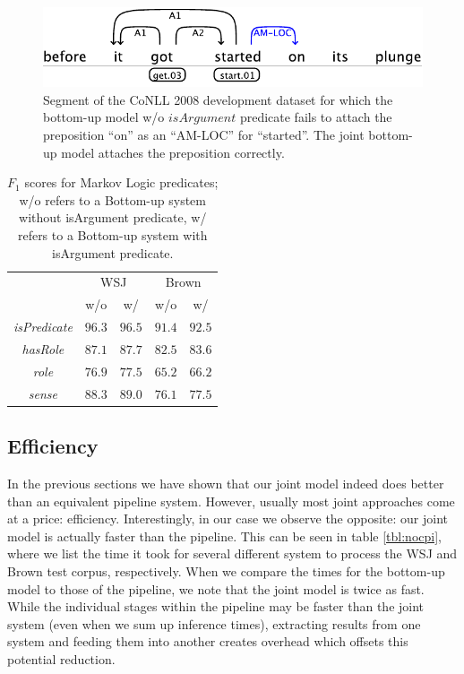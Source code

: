 \begin{figure}
\begin{center}
    \includegraphics[scale=.62]{is-arg-example}
\end{center}
\caption{Segment of the CoNLL 2008 development dataset for which the bottom-up model w/o $isArgument$ predicate fails to attach the preposition ``on'' as an ``AM-LOC'' for ``started''. The joint bottom-up model attaches the preposition correctly.}
\label{fig:isArg}
\end{figure}


\begin{table}[ht]

    \centering
    \begin{tabular}{|c|c|c|c|c|}\hline
      & \multicolumn{2}{c|}{WSJ} & \multicolumn{2}{c|}{Brown}\\
                                  & w/o     & w/     & w/o    & w/  \\\hline 
        \emph{isPredicate}        & $96.3$  & $96.5$ & $91.4$ & $92.5$\\
        \emph{hasRole}            & $87.1$  & $87.7$ & $82.5$ & $83.6$ \\
        \emph{role}               & $76.9$  & $77.5$ & $65.2$ & $66.2$ \\
        \emph{sense}              & $88.3$  & $89.0$ & $76.1$ & $77.5$ \\\hline
    \end{tabular}
    \caption{$F_1$ scores for Markov Logic predicates; w/o refers to a Bottom-up system without isArgument predicate, w/ refers to a Bottom-up system with isArgument predicate.}
    \label{tbl:isArg}
\end{table}

\subsection{Efficiency}
In the previous sections we have shown that our joint model indeed does better than an equivalent pipeline system. However, usually most joint approaches come at a price: efficiency. Interestingly, in our case we observe the opposite: our joint model is actually faster than the pipeline. This can be seen in table \ref{tbl:nocpi}, where we list the time it took for several different system to process the WSJ and Brown test corpus, respectively. When we compare the times for the bottom-up model to those of the pipeline, we note that the joint model is twice as fast. While the individual stages within the pipeline may be faster than the joint system (even when we sum up inference times), extracting results from one system and feeding them into another creates overhead which offsets this potential reduction.  

